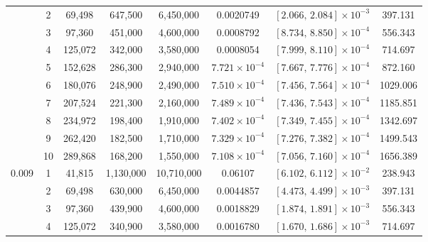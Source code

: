 \begin{longtable}{c|c|c|c|c|c|c|c}
& 2 & 69,498 & 647,500 & 6,450,000
& 0.0020749
& \(\left[2.066,\,2.084\right]\times10^{-3}\)
& 397.131 \\ \cline{2-8}

& 3 & 97,360 & 451,000 & 4,600,000
& 0.0008792
& \(\left[8.734,\,8.850\right]\times10^{-4}\)
& 556.343 \\ \cline{2-8}

& 4 & 125,072 & 342,000 & 3,580,000
& 0.0008054
& \(\left[7.999,\,8.110\right]\times10^{-4}\)
& 714.697 \\ \cline{2-8}

& 5 & 152,628 & 286,300 & 2,940,000
& \(7.721\times10^{-4}\)
& \(\left[7.667,\,7.776\right]\times10^{-4}\)
& 872.160 \\ \cline{2-8}

& 6 & 180,076 & 248,900 & 2,490,000
& \(7.510\times10^{-4}\)
& \(\left[7.456,\,7.564\right]\times10^{-4}\)
& 1029.006 \\ \cline{2-8}

& 7 & 207,524 & 221,300 & 2,160,000
& \(7.489\times10^{-4}\)
& \(\left[7.436,\,7.543\right]\times10^{-4}\)
& 1185.851 \\ \cline{2-8}

& 8 & 234,972 & 198,400 & 1,910,000
& \(7.402\times10^{-4}\)
& \(\left[7.349,\,7.455\right]\times10^{-4}\)
& 1342.697 \\ \cline{2-8}

& 9 & 262,420 & 182,500 & 1,710,000
& \(7.329\times10^{-4}\)
& \(\left[7.276,\,7.382\right]\times10^{-4}\)
& 1499.543 \\ \cline{2-8}

& 10 & 289,868 & 168,200 & 1,550,000
& \(7.108\times10^{-4}\)
& \(\left[7.056,\,7.160\right]\times10^{-4}\)
& 1656.389 \\
\hline

\multirow{10}{*}{0.009}
& 1 & 41,815 & 1,130,000 & 10,710,000
& 0.06107
& \(\left[6.102,\,6.112\right]\times10^{-2}\)
& 238.943 \\ \cline{2-8}

& 2 & 69,498 & 630,000 & 6,450,000
& 0.0044857
& \(\left[4.473,\,4.499\right]\times10^{-3}\)
& 397.131 \\ \cline{2-8}

& 3 & 97,360 & 439,900 & 4,600,000
& 0.0018829
& \(\left[1.874,\,1.891\right]\times10^{-3}\)
& 556.343 \\ \cline{2-8}

& 4 & 125,072 & 340,900 & 3,580,000
& 0.0016780
& \(\left[1.670,\,1.686\right]\times10^{-3}\)
& 714.697 \\ \cline{2-8}


\end{longtable}
